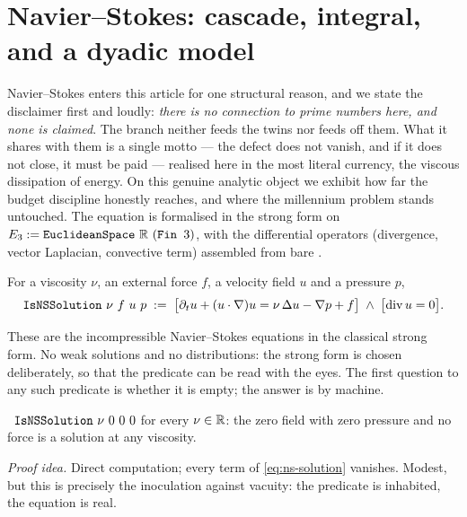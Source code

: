 \section{Navier--Stokes: cascade, integral, and a dyadic model}\label{sec:ns}

Navier--Stokes enters this article for one structural reason, and we state the disclaimer first
and loudly: \emph{there is no connection to prime numbers here, and none is claimed}. The branch
neither feeds the twins nor feeds off them. What it shares with them is a single motto --- the
defect does not vanish, and if it does not close, it must be paid --- realised here in the most
literal currency, the viscous dissipation of energy. On this genuine analytic object we exhibit
how far the budget discipline honestly reaches, and where the millennium problem stands untouched.
The equation is formalised in the strong form on $E_3 := \texttt{EuclideanSpace}\ \mathbb{R}\ (\texttt{Fin }3)$,
with the differential operators (divergence, vector Laplacian, convective term) assembled from bare
.

\begin{definition}\label{def:IsNSSolution}
For a viscosity $\nu$, an external force $f$, a velocity field $u$ and a pressure $p$,
\begin{equation}\label{eq:ns-solution}
\texttt{IsNSSolution}\ \nu\ f\ u\ p \;:=\;
\bigl[\partial_t u + (u\cdot\nabla)u = \nu\,\Delta u - \nabla p + f\bigr]
\;\wedge\; \bigl[\operatorname{div} u = 0\bigr].
\end{equation}
\end{definition}

\noindent These are the incompressible Navier--Stokes equations \cite{clay-ns,millennium} in the
classical strong form. No weak solutions and no distributions: the strong form is chosen
deliberately, so that the predicate can be read with the eyes. The first question to any such
predicate is whether it is empty; the answer is by machine.

\begin{theorem}\label{thm:zero_is_NSSolution}
\green{}\ $\texttt{IsNSSolution}\ \nu\ 0\ 0\ 0$ for every $\nu \in \mathbb{R}$: the zero field with zero
pressure and no force is a solution at any viscosity. 
\end{theorem}

\emph{Proof idea.} Direct computation; every term of \cref{eq:ns-solution} vanishes. Modest, but
this is precisely the inoculation against vacuity: the predicate is inhabited, the equation is real.

